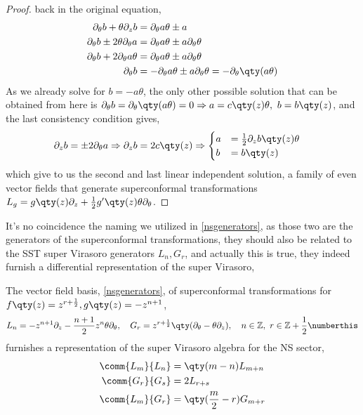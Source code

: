 \begin{proof}
back in the original equation,
\begin{align*}
    \partial_\theta b+\theta\partial_z b&=\partial_\theta a\theta\pm a\\
    \partial_\theta b\pm2\theta\partial_\theta a&=\partial_\theta a\theta\pm a\partial_\theta \theta\\
    \partial_\theta b+2\partial_\theta a\theta&=\partial_\theta a\theta\pm a\partial_\theta \theta\\
    \partial_\theta b&=-\partial_\theta a\theta\pm a\partial_\theta \theta=-\partial_\theta\qty(a\theta)
\end{align*}
As we already solve for $b=-a\theta$, the only other possible solution that can be obtained from here is 
$\partial_\theta b=\partial_\theta\qty(a\theta)=0\Rightarrow a=c\qty(z)\theta,\ b=b\qty(z)$, and the last consistency 
condition gives,
\begin{align*}
    \partial_z b&=\pm 2\partial_\theta a\Rightarrow\partial_z b= 2c\qty(z)\Rightarrow \begin{cases}a &= \frac12 \partial_z b\qty(z)\theta\\b &= b\qty(z)\end{cases} 
\end{align*}
which give to us the second and last linear independent solution, a family of even vector fields that generate 
superconformal transformations $L_g=g\qty(z)\partial_z+\frac12g'\qty(z)\theta\partial_\theta$.
\end{proof}
It's no coincidence the naming we utilized in \cref{nsgenerators}, as those two are the generators of the 
superconformal transformations, they should also be related to the SST super Virasoro generators $L_n,G_r$, 
and actually this is true, they indeed furnish a differential representation of the super Virasoro,
\begin{lemma}\label{lemma:nsgenerators}
    The vector field basis, \cref{nsgenerators}, of superconformal transformations for $f\qty(z)=z^{r+\frac12},g\qty(z)=-z^{n+1}$, 
    \[L_n=-z^{n+1}\partial_z-\frac{n+1}{2}z^n\theta\partial_\theta,\ \ \ G_r=z^{r+\frac12}\qty(\partial_\theta-\theta\partial_z),\ \ \ n\in\mathbb Z,\ r\in\mathbb Z+\frac12\numberthis\label{generators:ns2}\]
    furnishes a representation of the super Virasoro algebra for the NS sector,
    \begin{subequations}\begin{align}
        \comm{L_m}{L_n}&=\qty(m-n)L_{m+n}\\
        \comm{G_r}{G_s}&=2L_{r+s}\\
        \comm{L_m}{G_r}&=\qty(\frac m2-r)G_{m+r}
    \end{align}\label{supervirasoro:ns}\end{subequations}
\end{lemma}
